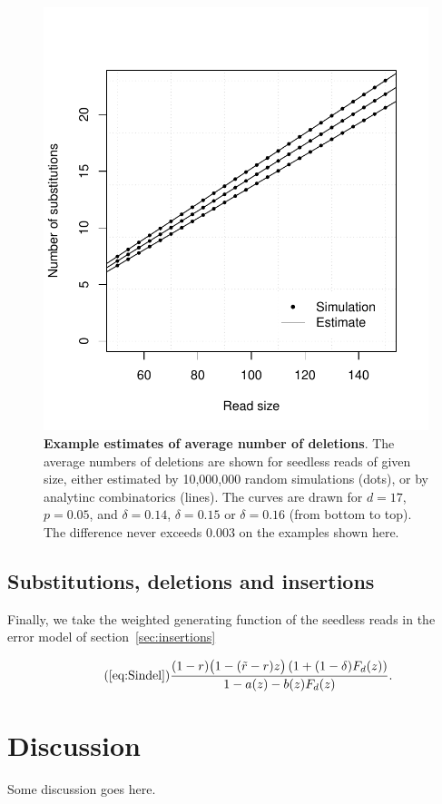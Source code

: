 \documentclass{article}
\begin{document}
\begin{figure}[h]
\centering
\includegraphics[scale=0.445]{simuldel-average.pdf}
\caption{\textbf{Example estimates of average number of deletions}. The
average numbers of deletions are shown for seedless reads of given size,
either estimated by 10,000,000 random simulations (dots), or by analytinc
combinatorics (lines). The curves are drawn for $d=17$, $p=0.05$, and
$\delta=0.14$, $\delta=0.15$ or $\delta=0.16$ (from bottom to top). The
difference never exceeds 0.003 on the examples shown here.}
\label{fig:simulavdel}
\end{figure}




\subsection{Substitutions, deletions and insertions}

Finally, we take the weighted generating function of the seedless reads in
the error model of section~\ref{sec:insertions}

\begin{equation}
\tag{\ref{eq:Sindel}}
\frac{(1-r)\big( 1-(\tilde{r}-r)z \big) \left(1+(1-\delta)F_d(z)
\right)}{1-a(z)-b(z)F_d(z)}.
\end{equation}

\section{Discussion}

Some discussion goes here.





\end{document}
